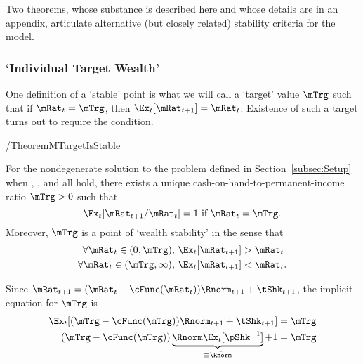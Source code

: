\documentclass[BufferStockTheory]{subfiles}
\begin{document}
Two theorems, whose substance is described here and whose details are in an appendix, articulate alternative (but closely related) stability criteria for the model.

\subsubsection{`Individual Target Wealth'}\label{subsubsec:mTarget}
One definition of a `stable' point is what we will call a `target' value $\mTrg$ such that if $\mRat_{t}=\mTrg$, then $\Ex_{t}[\mRat_{t+1}]=\mRat_{t}$.  Existence of such a target turns out to require the {\GICNrm} condition.

\begin{verbatimwrite}{\EqDir/TheoremMTargetIsStable}
\begin{theorem}\label{thm:target}
  For the nondegenerate solution to the problem defined in Section~\ref{subsec:Setup} when {\FVAC}, {\WRIC}, and {\GICNrm} all hold, there exists a unique cash-on-hand-to-permanent-income ratio $\mTrg>0$ such that
  \begin{equation}
    \Ex_t [{\mRat}_{t+1}/\mRat_t] = 1 \mbox{~if~} \mRat_t = \mTrg.
    \label{eq:mTarget}
  \end{equation}
  Moreover, $\mTrg$ is a point of `wealth stability' in the sense that
  \begin{align}\label{eq:stability}
    \forall {\mRat}_t\in(0,\mTrg),      \,\,& \Ex_t [{\mRat}_{t+1}] > {\mRat}_t  \\
    \forall {\mRat}_t\in(\mTrg,\infty), \,\,& \Ex_t [{\mRat}_{t+1}] < {\mRat}_t. \notag
  \end{align}
  \end{theorem}
\end{verbatimwrite}


 \hypertarget{mTargImplicit}{}

 Since $\mRat_{t+1}=(\mRat_{t}-\cFunc(\mRat_{t}))\Rnorm_{t+1}+\tShk_{t+1}$, the implicit equation for $\mTrg$ is
 \begin{align}
  \Ex_{t}[(\mTrg-\cFunc(\mTrg))\Rnorm_{t+1}+\tShk_{t+1}] & = \mTrg \label{eq:mTargImplicit}
\\   (\mTrg-\cFunc(\mTrg))\underbrace{\Rnorm\Ex_{t}[\pShk^{-1}]}_{\equiv \bar{\Rnorm}}+1 & = \mTrg \notag
 \end{align}
\end{document}
